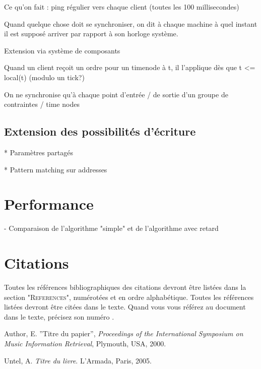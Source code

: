 \documentclass{article}
\begin{document}
Ce qu'on fait : ping régulier vers chaque client (toutes les 100 millisecondes)

Quand quelque chose doit se synchroniser, on dit à chaque machine à quel instant il est supposé arriver par rapport à son horloge système.

Extension via système de composants

Quand un client reçoit un ordre pour un timenode à t, il l'applique dès que t <= local(t) (modulo un tick?)

On ne synchronise qu'à chaque point d'entrée / de sortie d'un groupe de contraintes / time nodes
\subsection{Extension des possibilités d'écriture}
* Paramètres partagés

* Pattern matching sur addresses 

\section{Performance}
- Comparaison de l'algorithme "simple" et de l'algorithme avec retard

\section{Citations}

Toutes les références bibliographiques des citations devront être listées dans la section "\textsc{References}", numérotées et en ordre alphabétique. Toutes les références  listées devront être citées dans le texte. Quand  vous vous référez au document dans le texte, précisez son numéro \cite{Author:00}.

\begin{thebibliography}{2}

 Author, E.
''Titre du papier'',
{\it Proceedings of the International Symposium on Music Information
Retrieval}, Plymouth, USA, 2000.

 Untel, A.
{\it  Titre du livre}.
L'Armada, Paris, 2005.

\end{thebibliography}
\end{document}
